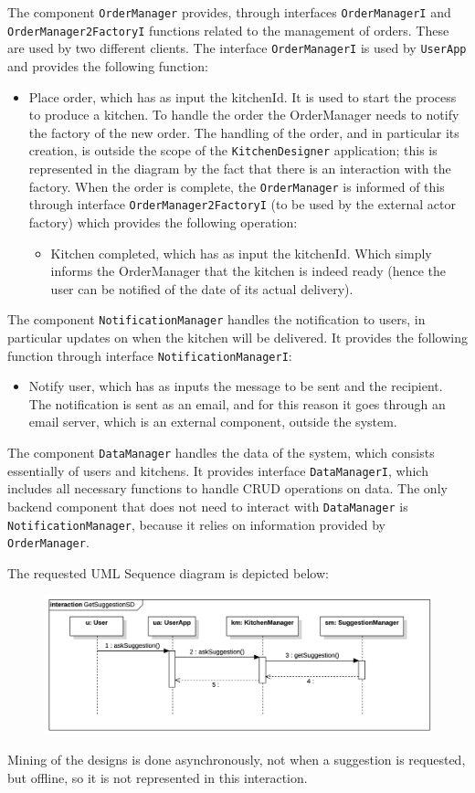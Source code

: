 The component \texttt{OrderManager} provides, through interfaces \texttt{OrderManagerI} and \texttt{OrderManager2FactoryI} functions related to the management of orders. 
These are used by two different clients. 
The interface \texttt{OrderManagerI} is used by \texttt{UserApp} and provides the following function: 
\begin{itemize}
\item Place order, which has as input the kitchenId.
    It is used to start the process to produce a kitchen. 
    To handle the order the OrderManager needs to notify the factory of the new order. 
    The handling of the order, and in particular its creation, is outside the scope of the \texttt{KitchenDesigner} application; this is represented in the diagram by the fact that there is an interaction with the factory. 
    When the order is complete, the \texttt{OrderManager} is informed of this through interface \texttt{OrderManager2FactoryI} (to be used by the external actor factory) which provides the following operation:
    \begin{itemize}
        \item Kitchen completed, which has as input the kitchenId. 
            Which simply informs the OrderManager that the kitchen is indeed ready (hence the user can be notified of the date of its actual delivery).
    \end{itemize}
\end{itemize}

The component \texttt{NotificationManager} handles the notification to users, in particular updates on when the kitchen will be delivered. 
It provides the following function through interface \texttt{NotificationManagerI}:
\begin{itemize}
    \item Notify user, which has as inputs the message to be sent and the recipient. 
        The notification is sent as an email, and for this reason it goes through an email server, which is an external component, outside the system.
\end{itemize}

The component \texttt{DataManager} handles the data of the system, which consists essentially of users and kitchens. 
It provides interface \texttt{DataManagerI}, which includes all necessary functions to handle CRUD operations on data.
The only backend component that does not need to interact with \texttt{DataManager} is \texttt{NotificationManager}, because it relies on information provided by \texttt{OrderManager}.

The requested UML Sequence diagram is depicted below: 
\begin{figure}[H]
    \centering
    \includegraphics[width=0.9\linewidth]{images/sd2.png}
\end{figure}
Mining of the designs is done asynchronously, not when a suggestion is requested, but offline, so it is not represented in this interaction.